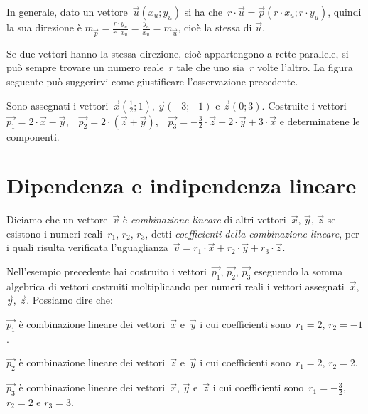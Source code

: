 In generale, dato un vettore~$\vec{u}(x_u;y_u)$ si ha che~$r \cdot \vec{u} = \vec{p}(r \cdot x_u; r \cdot y_u)$, quindi la sua direzione è $m_{\vec{p}}=\frac{r \cdot y_u}{r \cdot x_u}=\frac{y_u}{x_u}= m_{\vec{u}}$, cioè la stessa di $\vec{u}$.

\begin{osservazione}
Se due vettori hanno la stessa direzione, cioè appartengono a rette parallele, si può sempre trovare un numero reale~$r$
tale che uno sia~$r$ volte l'altro. La figura seguente può suggerirvi come giustificare l'osservazione precedente.
\begin{center}
 
\end{center}
\end{osservazione}

\begin{exrig}
\begin{esempio}

Sono assegnati i vettori~$\vec{x}(\frac {1}{2};1)$, $\vec{y}(-3;-1)$ e $\vec{z}(0;3)$.
Costruite i vettori~$\vec{p_1}=2 \cdot \vec{x}-\vec{y}$,~~$\vec{p_2}=2 \cdot (\vec{z}+\vec{y})$,~~$\vec{p_3}=-\frac {3}{2} \cdot \vec{z} +2 \cdot \vec{y}+3 \cdot \vec{x}$
e determinatene le componenti.
\end{esempio}
\end{exrig}


\ovalbox{\risolvii \ref{ese:F.4}, \ref{ese:F.5}, \ref{ese:F.6}}

\section{Dipendenza e indipendenza lineare}

\begin{definizione}
Diciamo che un vettore~$\vec{v}$ è \emph{combinazione lineare} di altri vettori~$\vec{x}$, $\vec{y}$, $\vec{z}$ se esistono
i numeri reali~$r_1$, $r_2$, $r_3$, detti \emph{coefficienti della combinazione lineare}, per i quali risulta verificata
l'uguaglianza~$\vec{v}=r_1 \cdot \vec{x} + r_2 \cdot \vec{y} + r_3 \cdot \vec{z}$.
\end{definizione}
\begin{exrig}
\begin{esempio}
Nell'esempio precedente hai costruito i vettori~$\vec{p_1}$, $\vec{p_2}$, $\vec{p_3}$ eseguendo la somma algebrica di vettori costruiti moltiplicando
per numeri reali i vettori assegnati~$\vec{x}$, $\vec{y}$, $\vec{z}$. Possiamo dire che:
\begin{itemize*}
\item $\vec{p_1}$ è combinazione lineare dei vettori~$\vec{x}$ e~$\vec{y}$ i cui coefficienti sono~$r_1=2$, $r_2=-1$.
\item $\vec{p_2}$ è combinazione lineare dei vettori~$\vec{z}$ e~$\vec{y}$ i cui coefficienti sono~$r_1=2$, $r_2=2$.
\item $\vec{p_3}$ è combinazione lineare dei vettori~$\vec{x}$, $\vec{y}$ e~$\vec{z}$ i cui coefficienti sono~$r_1=-\frac{3}{2}$, $r_2=2$ e $r_3=3$.
\end{itemize*}
\end{esempio}
\end{exrig}

